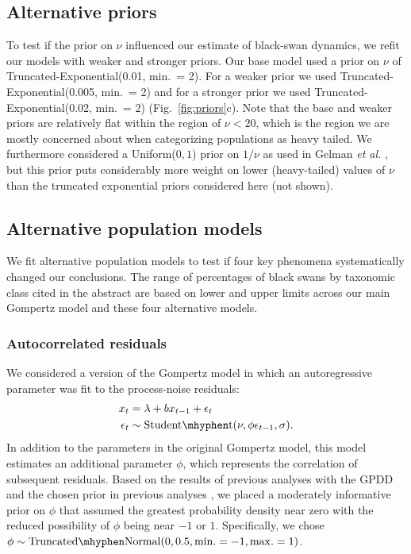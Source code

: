 \subsection{Alternative priors}

To test if the prior on \(\nu\) influenced our estimate of black-swan dynamics,
we refit our models with weaker and stronger priors. Our base model used a
prior on \(\nu\) of Truncated-Exponential(0.01, min.\ = 2). For a weaker prior
we used Truncated-Exponential(0.005, min.\ = 2) and for a stronger prior we
used Truncated-Exponential(0.02, min.\ = 2) (Fig.~\ref{fig:priors}c). Note that
the base and weaker priors are relatively flat within the region of \(\nu <
20\), which is the region we are mostly concerned about when categorizing
populations as heavy tailed. We furthermore considered a Uniform(\(0, 1\))
prior on \(1/\nu\) as used in Gelman \emph{et al.} \citep{gelman2014}, but this
prior puts considerably more weight on lower (heavy-tailed) values of \(\nu\)
than the truncated exponential priors considered here (not shown).

\subsection{Alternative population models} We fit alternative population models to
test if four key phenomena systematically changed our conclusions. The range of
percentages of black swans by taxonomic class cited in the abstract are based
on lower and upper limits across our main Gompertz model and these four
alternative models.

\subsubsection{Autocorrelated residuals} We considered a version of the Gompertz
model in which an autoregressive parameter was fit to the process-noise
residuals: \begin{align} x_t &= \lambda + b x_{t-1} + \epsilon_t\\ \epsilon_t
&\sim \mathrm{Student\mhyphen t}(\nu, \phi \epsilon_{t-1}, \sigma). \end{align}
In addition to the parameters in the original Gompertz model, this model
estimates an additional parameter \(\phi\), which represents the correlation of
subsequent residuals. Based on the results of previous analyses with the
GPDD \citep{connors2014} and the chosen prior in previous
analyses \citep{thorson2014a}, we placed a moderately informative prior on
\(\phi\) that assumed the greatest probability density near zero with the
reduced possibility of \(\phi\) being near \(-1\) or \(1\). Specifically, we
chose \(\phi \sim \mathrm{Truncated\mhyphen Normal}(0, 0.5, \mathrm{min.} = -1,
\mathrm{max.} = 1)\).

